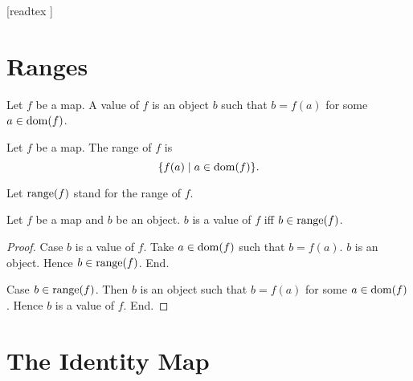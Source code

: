 \documentclass[10pt]{article}
\begin{document}
  \begin{imports}
    \begin{forthel}
      [readtex ]
    \end{forthel}
  \end{imports}


  \section{Ranges}

  \begin{forthel}
    \begin{definition}
      Let $f$ be a map.
      A value of $f$ is an object $b$ such that $b = f(a)$ for some
      $a \in \operatorname{dom}(f)$.
    \end{definition}
  \end{forthel}

  \begin{forthel}
    \begin{definition}
      Let $f$ be a map.
      The range of $f$ is
      \[ \{ f(a) \mid a \in \operatorname{dom}(f) \}. \]
    \end{definition}

    Let $\textrm{range}(f)$ stand for the range of $f$.
  \end{forthel}

  \begin{forthel}
    \begin{proposition}
      Let $f$ be a map and $b$ be an object.
      $b$ is a value of $f$ iff $b \in \textrm{range}(f)$.
    \end{proposition}
    \begin{proof}
      Case $b$ is a value of $f$.
        Take $a \in \operatorname{dom}(f)$ such that $b = f(a)$.
        $b$ is an object.
        Hence $b \in \textrm{range}(f)$.
      End.

      Case $b \in \textrm{range}(f)$.
        Then $b$ is an object such that $b = f(a)$ for some $a \in \operatorname{dom}(f)$.
        Hence $b$ is a value of $f$.
      End.
    \end{proof}
  \end{forthel}


  \section{The Identity Map}
\end{document}
